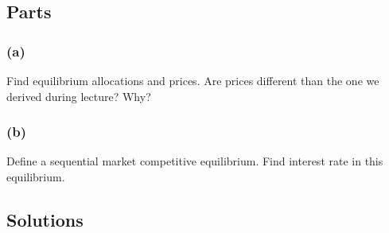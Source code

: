 \documentclass[10pt, a4paper]{article}
\begin{document}
  \subsection*{Parts}
    \subsubsection*{(a)}
      Find equilibrium allocations and prices. Are prices different than the one we derived during lecture? Why?

    \subsubsection*{(b)}
      Define a sequential market competitive equilibrium. Find interest rate in this equilibrium.

  \subsection*{Solutions}
\end{document}
